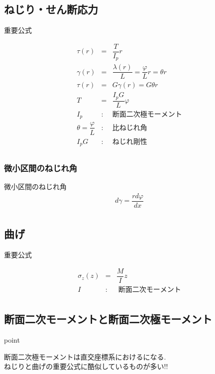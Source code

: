 \documentclass[a4paper]{jsarticle}
\begin{document}
\subsection{ねじり・せん断応力}
\begin{itembox}[l]{重要公式}
    \begin{center}
        \begin{eqnarray*}
            \tau\left(r\right)&=&\dfrac{T}{I_p} r\\
            \gamma\left(r\right)&=&\dfrac{\lambda\left(r\right)}{L}=\dfrac{\varphi}{L}r=\theta r\\
            \tau\left(r\right)&=&G\gamma\left(r\right)=G\theta r\\
            T&=&\dfrac{I_pG}{L}\varphi\\
            I_p&:&断面二次極モーメント\\
            \theta=\dfrac{\varphi}{L}&:&比ねじれ角\\
            I_pG&:&ねじれ剛性\\
        \end{eqnarray*}
    \end{center}
\end{itembox}
\subsubsection{微小区間のねじれ角}
\begin{itembox}[l]{微小区間のねじれ角}
    \begin{eqnarray*}
        d\gamma=\dfrac{rd\varphi}{dx}\\
    \end{eqnarray*}
\end{itembox}
\subsection{曲げ}
\begin{itembox}[l]{重要公式}
    \begin{center}
        \begin{eqnarray*}
            \sigma_z\left(z\right)&=&\dfrac{M}{I}z\\
            I&:&\;断面二次モーメント\\
        \end{eqnarray*}
    \end{center}
\end{itembox}
\subsection{断面二次モーメントと断面二次極モーメント}
\begin{itembox}[l]{point}
    \begin{center}
        断面二次極モーメントは直交座標系におけるになる.\\
        ねじりと曲げの重要公式に酷似しているものが多い!!
    \end{center}
\end{itembox}
\end{document}
